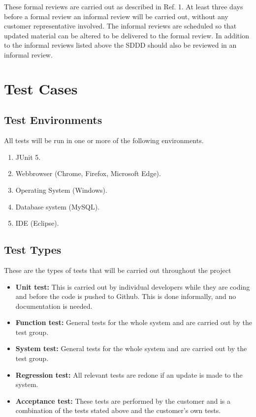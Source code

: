 \documentclass{article}
\begin{document}
\noindent
These formal reviews are carried out as described in Ref. 1. At least three days before a formal review an informal review will be carried out, without any customer representative involved. The informal reviews are scheduled so that updated material can be altered to be delivered to the formal review. In addition to the informal reviews listed above the SDDD should also be reviewed in an informal review. 

\section{Test Cases}
	\subsection{Test Environments}
	All tests will be run in one or more of the following environments. 
		\begin{enumerate}
			\item JUnit 5.

			\item Webbrowser (Chrome, Firefox, Microsoft Edge).

			\item Operating System (Windows).

			\item Database system (MySQL).

			\item IDE (Eclipse).	
		\end{enumerate}
		
		\subsection{Test Types}
		
These are the types of tests that will be carried out throughout the project


\begin{itemize}
  \item \textbf{Unit test:} This is carried out by individual developers while they are coding and before the code is pushed to Github. This is done informally, and no documentation is needed.
  \item \textbf{Function test:} General tests for the whole system and are carried out by the test group.
   \item \textbf{System test:} General tests for the whole system and are carried out by the test group.
      \item \textbf{Regression test:} All relevant tests are redone if an update is made to the system.
         \item \textbf{Acceptance test:} These tests are performed by the customer and is a combination of the tests stated above and the customer's own tests.
\end{itemize}
\end{document}
